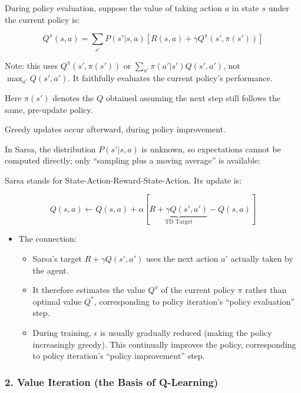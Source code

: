 During policy evaluation, suppose the value of taking action \(a\) in state \(s\) under the current policy is:

\[
Q^{\pi}(s,a)=\sum_{s'}P(s'|s,a)[R(s,a)+\gamma Q^{\pi}(s',\pi(s'))]
\]

Note: this uses \(Q^{\pi}(s',\pi(s'))\) or \(\sum_{a'}\pi(a'|s')Q(s',a')\), not \(\max_{a'}Q(s',a')\). It faithfully evaluates the current policy's performance.

Here \(\pi(s')\) denotes the \(Q\) obtained assuming the next step still follows the same, pre-update policy.

Greedy updates occur afterward, during policy improvement.

In Sarsa, the distribution \(P(s'|s,a)\) is unknown, so expectations cannot be computed directly; only ``sampling plus a moving average'' is available:

Sarsa stands for State-Action-Reward-State-Action. Its update is:

\[
Q(s,a)\leftarrow Q(s,a)+\alpha[\underbrace{R+\gamma Q(s',a')}_{\text{TD Target}}-Q(s,a)]
\]

\begin{itemize}
\tightlist
\item
{}
  The connection:

  \begin{itemize}
  \tightlist
  \item
    Sarsa's target \(R+\gamma Q(s',a')\) uses the next action \(a'\) actually taken by the agent.
  \item
    It therefore estimates the value \(Q^{\pi}\) of the current policy \(\pi\) rather than optimal value \(Q^{*}\), corresponding to policy iteration's ``policy evaluation'' step.
  \item
    During training, \(\epsilon\) is usually gradually reduced (making the policy increasingly greedy). This continually improves the policy, corresponding to policy iteration's ``policy improvement'' step.
  \end{itemize}
\end{itemize}

\hypertarget{value-iteration-the-basis-of-q-learning}{%
\subsubsection{2. Value Iteration (the Basis of Q-Learning)}\label{value-iteration-the-basis-of-q-learning}}

